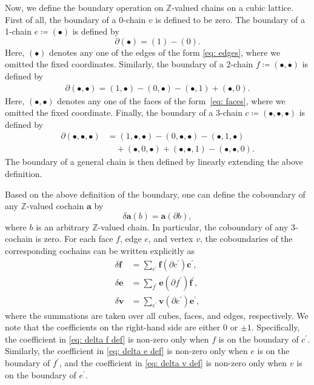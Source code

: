 \documentclass[aps,twocolumn,prx,floatfix,preprintnumbers, nofootinbib,10pt]{revtex4-2}
\numberwithin{equation}{section}
\theoremstyle{definition}
\theoremstyle{remark}
\theoremstyle{claim}
\begin{document}
\vspace{\baselineskip}
Now, we define the boundary operation on $\mathbb{Z}$-valued chains on a cubic lattice.
First of all, the boundary of a 0-chain $v$ is defined to be zero.
The boundary of a 1-chain $e \coloneq (\bullet)$ is defined by
\begin{equation}
\partial (\bullet) = (1) - (0).
\label{eq: partial e def}
\end{equation}
Here, $(\bullet)$ denotes any one of the edges of the form \eqref{eq: edges}, where we omitted the fixed coordinates.
Similarly, the boundary of a 2-chain $f \coloneq (\bullet, \bullet)$ is defined by
\begin{align}
\partial (\bullet, \bullet) = (1, \bullet) - (0, \bullet) - (\bullet, 1) + (\bullet, 0).
\label{eq: partial f def}
\end{align}
Here, $(\bullet, \bullet)$ denotes any one of the faces of the form~\eqref{eq: faces}, where we omitted the fixed coordinate.
Finally, the boundary of a 3-chain $c \coloneq (\bullet, \bullet, \bullet)$ is defined by
\begin{equation}
\begin{aligned}
\partial (\bullet, \bullet, \bullet) &= (1, \bullet, \bullet) - (0, \bullet, \bullet) - (\bullet, 1, \bullet) \\
& \quad + (\bullet, 0, \bullet) + (\bullet, \bullet, 1) - (\bullet, \bullet, 0).
\end{aligned}
\label{eq: partial c def}
\end{equation}
The boundary of a general chain is then defined by linearly extending the above definition.

Based on the above definition of the boundary, one can define the coboundary of any $\mathbb{Z}$-valued cochain $\bm{a}$ by
\begin{equation}
\delta \bm{a}(b) = \bm{a}(\partial b),
\end{equation}
where $b$ is an arbitrary $\mathbb{Z}$-valued chain.
In particular, the coboundary of any 3-cochain is zero.
For each face $f$, edge $e$, and vertex $v$, the coboundaries of the corresponding cochains can be written explicitly as
\begin{align}
\delta \bm{f} &= \sum_{c^{\prime}} \bm{f}(\partial c^{\prime}) \bm{c}^{\prime},
\label{eq: delta f def}
\\
\delta \bm{e} &= \sum_{f^{\prime}} \bm{e}(\partial f^{\prime}) \bm{f}^{\prime},
\label{eq: delta e def}
\\
\delta \bm{v} &= \sum_{e^{\prime}} \bm{v}(\partial e^{\prime}) \bm{e^{\prime}},
\label{eq: delta v def}
\end{align}
where the summations are taken over all cubes, faces, and edges, respectively.
We note that the coefficients on the right-hand side are either $0$ or $\pm 1$.
Specifically, the coefficient in \eqref{eq: delta f def} is non-zero only when $f$ is on the boundary of $c^{\prime}$.
Similarly, the coefficient in \eqref{eq: delta e def} is non-zero only when $e$ is on the boundary of $f^{\prime}$, and the coefficient in \eqref{eq: delta v def} is non-zero only when $v$ is on the boundary of $e^{\prime}$.
\end{document}

